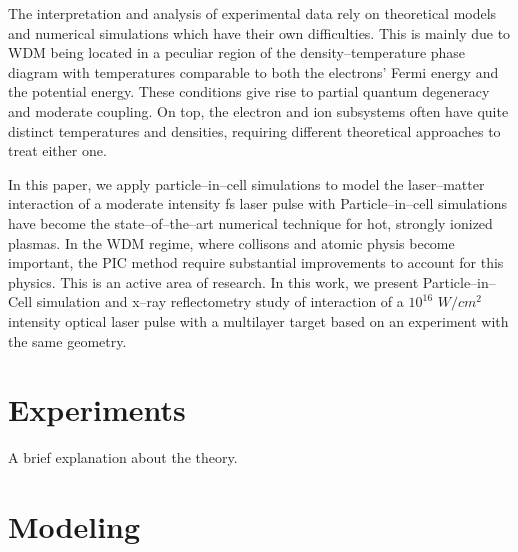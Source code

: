 \documentclass[preprint, 12pt]{elsarticle}
\begin{document}
The interpretation and analysis of experimental data
rely on theoretical models
and numerical simulations which have their own difficulties.
This is mainly due to WDM being located in a peculiar region of the density--temperature phase
diagram with temperatures comparable to both the electrons' Fermi energy and the
potential energy. These conditions give rise to partial quantum degeneracy and
moderate coupling. On top, the electron and ion subsystems often have quite distinct
temperatures and densities, requiring different theoretical approaches to treat
either one.

In this paper, we apply particle--in--cell simulations to model the
laser--matter interaction of a moderate intensity \si{\fs} laser pulse with
Particle--in--cell simulations \cite{} have become the state--of--the--art
numerical technique for hot, strongly ionized plasmas. In the WDM regime, where
collisons and atomic physis become important, the PIC method require substantial
improvements to account for this physics. This is an active area of research.
In this work, we present Particle--in--Cell simulation and x--ray reflectometry
study of interaction of a $10^{16}$ $W/cm^2$ intensity optical laser pulse with
a multilayer target based on an experiment with the same geometry.

\section{Experiments}

A brief explanation about the theory.

\section{Modeling}
\label{S:2}
\end{document}
